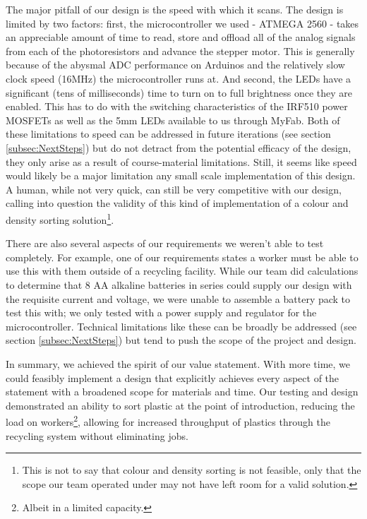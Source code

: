 \documentclass[12pt]{article}
\begin{document}
\begin{multicols*}{2}
            The major pitfall of our design is the speed with which it scans. The design is limited by two factors: first, the microcontroller we used - ATMEGA 2560 - takes an appreciable amount of time to read, store and offload all of the analog signals from each of the photoresistors and advance the stepper motor. This is generally because of the abysmal ADC performance on Arduinos and the relatively slow clock speed (16MHz) the microcontroller runs at. And second, the LEDs have a significant (tens of milliseconds) time to turn on to full brightness once they are enabled. This has to do with the switching characteristics of the IRF510 power MOSFETs as well as the 5mm LEDs available to us through MyFab. Both of these limitations to speed can be addressed in future iterations (see section \ref{subsec:NextSteps}) but do not detract from the potential efficacy of the design, they only arise as a result of course-material limitations. Still, it seems like speed would likely be a major limitation any small scale implementation of this design. A human, while not very quick, can still be very competitive with our design, calling into question the validity of this kind of implementation of a colour and density sorting solution\footnote{This is not to say that colour and density sorting is not feasible, only that the scope our team operated under may not have left room for a valid solution.}.   

            There are also several aspects of our requirements we weren't able to test completely. For example, one of our requirements states a worker must be able to use this with them outside of a recycling facility. While our team did calculations to determine that 8 AA alkaline batteries in series could supply our design with the requisite current and voltage, we were unable to assemble a battery pack to test this with; we only tested with a power supply and regulator for the microcontroller. Technical limitations like these can be broadly be addressed (see section \ref{subsec:NextSteps}) but tend to push the scope of the project and design.           
            
            In summary, we achieved the spirit of our value statement. With more time, we could feasibly implement a design that explicitly achieves every aspect of the statement with a broadened scope for materials and time. Our testing and design demonstrated an ability to sort plastic at the point of introduction, reducing the load on workers\footnote{Albeit in a limited capacity.}, allowing for increased throughput of plastics through the recycling system without eliminating jobs.  



\end{multicols*}
\end{document}

